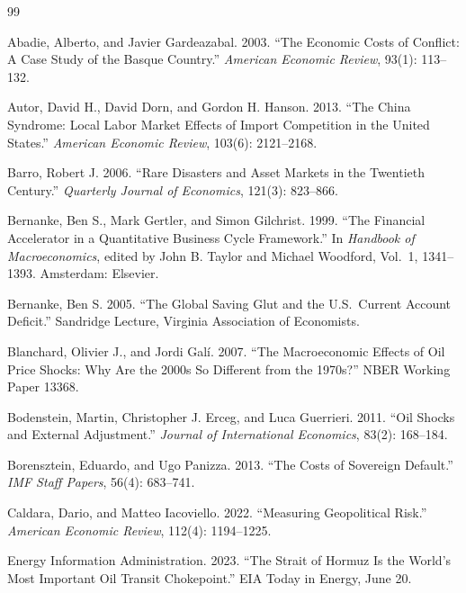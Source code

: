 \documentclass[12pt]{article}
\begin{document}
\begin{thebibliography}{99}

Abadie, Alberto, and Javier Gardeazabal. 2003. ``The Economic Costs of Conflict: A Case Study of the Basque Country.'' \textit{American Economic Review}, 93(1): 113--132.

Autor, David H., David Dorn, and Gordon H. Hanson. 2013. ``The China Syndrome: Local Labor Market Effects of Import Competition in the United States.'' \textit{American Economic Review}, 103(6): 2121--2168.

Barro, Robert J. 2006. ``Rare Disasters and Asset Markets in the Twentieth Century.'' \textit{Quarterly Journal of Economics}, 121(3): 823--866.

Bernanke, Ben S., Mark Gertler, and Simon Gilchrist. 1999. ``The Financial Accelerator in a Quantitative Business Cycle Framework.'' In \textit{Handbook of Macroeconomics}, edited by John B. Taylor and Michael Woodford, Vol.~1, 1341--1393. Amsterdam: Elsevier.

Bernanke, Ben S. 2005. ``The Global Saving Glut and the U.S.\ Current Account Deficit.'' Sandridge Lecture, Virginia Association of Economists.

Blanchard, Olivier J., and Jordi Gal\'{i}. 2007. ``The Macroeconomic Effects of Oil Price Shocks: Why Are the 2000s So Different from the 1970s?'' NBER Working Paper 13368.

Bodenstein, Martin, Christopher J. Erceg, and Luca Guerrieri. 2011. ``Oil Shocks and External Adjustment.'' \textit{Journal of International Economics}, 83(2): 168--184.

Borensztein, Eduardo, and Ugo Panizza. 2013. ``The Costs of Sovereign Default.'' \textit{IMF Staff Papers}, 56(4): 683--741.

Caldara, Dario, and Matteo Iacoviello. 2022. ``Measuring Geopolitical Risk.'' \textit{American Economic Review}, 112(4): 1194--1225.

Energy Information Administration. 2023. ``The Strait of Hormuz Is the World's Most Important Oil Transit Chokepoint.'' EIA Today in Energy, June 20.


\end{thebibliography}
\end{document}
